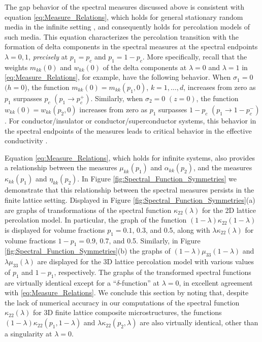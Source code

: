 \documentclass{cmslatex}
\begin{document}
The gap behavior of the spectral measures discussed above is
consistent with equation \eqref{eq:Measure_Relations}, which holds for
general stationary random media in the infinite setting
\cite{Murphy:JMP:063506}, and consequently holds for percolation
models of such media. This equation characterizes the percolation
transition with the formation of delta components in the spectral
measures at the spectral endpoints $\lambda=0,1$, \emph{precisely} at
$p_1=p_c$ and $p_1=1-p_c$. More specifically, recall that the weights
$m_{kk}(0)$ and $w_{kk}(0)$ of the delta components at $\lambda=0$ and $\lambda=1$ in
\eqref{eq:Measure_Relations}, for example, have the following
behavior. When $\sigma_1=0$ $(h=0$), the function
$m_{kk}(0)=m_{kk}(p_1,0)$, $k=1,\ldots,d$, increases from zero as 
$p_1$ surpasses $p_c$ $(p_1\to p_c^+)$. Similarly, when $\sigma_2=0$
$(z=0)$, the function $w_{kk}(0)=w_{kk}(p_2,0)$ increases from zero as
$p_1$ surpasses $1-p_c$ $(p_1\to1-p_c^-)$. For conductor/insulator or
conductor/superconductor systems, this behavior in the spectral
endpoints of the measures leads to critical behavior in the effective
conductivity \cite{Murphy:JMP:063506,Golden:JMP-5627}. 




Equation \eqref{eq:Measure_Relations}, which holds for infinite
systems, also provides a relationship 
between the measures $\mu_{kk}(p_1)$ and $\alpha_{kk}(p_2)$, and the measures
$\kappa_{kk}(p_1)$ and $\eta_{kk}(p_2)$. In Figure \ref{fig:Spectral_Function_Symmetries} we
demonstrate that this relationship between the spectral measures
persists in the finite lattice setting. Displayed in Figure
\ref{fig:Spectral_Function_Symmetries}(a) are graphs of 
transformations of the spectral function $\kappa_{22}(\lambda)$ for the 2D
lattice percolation model. In particular,
the graph of the function $(1-\lambda)\kappa_{22}(1-\lambda)$ is displayed for
volume fractions $p_1=0.1$, 0.3, and 0.5, along with $\lambda\kappa_{22}(\lambda)$ for
volume fractions $1-p_1=0.9$, 0.7, and 0.5. Similarly, in Figure
\ref{fig:Spectral_Function_Symmetries}(b) the graphs of
$(1-\lambda)\mu_{33}(1-\lambda)$ and $\lambda\mu_{33}(\lambda)$ are displayed for the 3D lattice
percolation model with various values
of $p_1$ and $1-p_1$, respectively. The graphs of the 
transformed spectral functions are virtually identical except for a
``$\delta$-function'' at $\lambda=0$, in excellent agreement with
\eqref{eq:Measure_Relations}. We conclude this section by noting that,
despite the lack of numerical accuracy in our computations of the
spectral function $\kappa_{22}(\lambda)$ for 3D finite lattice composite
microstructures, the functions $(1-\lambda)\kappa_{22}(p_1,1-\lambda)$ and
$\lambda\kappa_{22}(p_2,\lambda)$ are also virtually identical, other than a singularity
at $\lambda=0$. 
\end{document}
